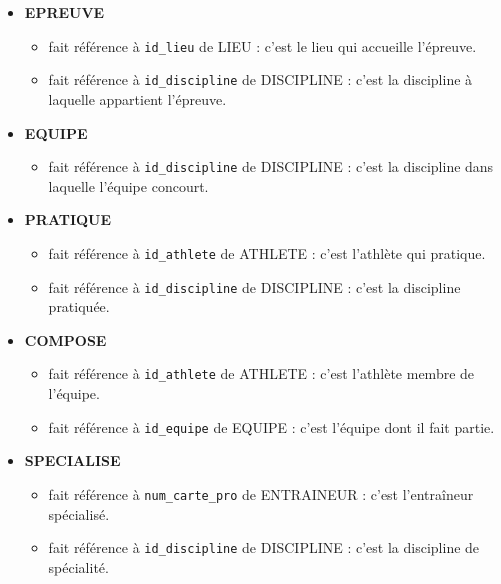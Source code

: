 \begin{itemize}
  \item \textbf{EPREUVE}
  \begin{itemize}
    \item {} fait référence à \texttt{id\_lieu} de LIEU : c'est le lieu qui accueille l'épreuve.
    \item {} fait référence à \texttt{id\_discipline} de DISCIPLINE : c'est la discipline à laquelle appartient l'épreuve.
  \end{itemize}

  \item \textbf{EQUIPE}
  \begin{itemize}
    \item {} fait référence à \texttt{id\_discipline} de DISCIPLINE : c'est la discipline dans laquelle l'équipe concourt.
  \end{itemize}

  \item \textbf{PRATIQUE}
  \begin{itemize}
    \item {} fait référence à \texttt{id\_athlete} de ATHLETE : c'est l'athlète qui pratique.
    \item {} fait référence à \texttt{id\_discipline} de DISCIPLINE : c'est la discipline pratiquée.
  \end{itemize}

  \item \textbf{COMPOSE}
  \begin{itemize}
    \item {} fait référence à \texttt{id\_athlete} de ATHLETE : c'est l'athlète membre de l'équipe.
    \item {} fait référence à \texttt{id\_equipe} de EQUIPE : c'est l'équipe dont il fait partie.
  \end{itemize}

  \item \textbf{SPECIALISE}
  \begin{itemize}
    \item {} fait référence à \texttt{num\_carte\_pro} de ENTRAINEUR : c'est l'entraîneur spécialisé.
    \item {} fait référence à \texttt{id\_discipline} de DISCIPLINE : c'est la discipline de spécialité.
  \end{itemize}


\end{itemize}
